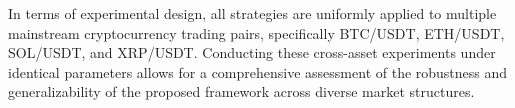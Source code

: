 \documentclass[12pt]{article}
\begin{document}
In terms of experimental design, all strategies are uniformly applied to multiple mainstream 
cryptocurrency trading pairs, specifically BTC/USDT, ETH/USDT, SOL/USDT, and XRP/USDT. 
Conducting these cross-asset experiments under identical parameters allows for a 
comprehensive assessment of the robustness and generalizability of the proposed framework 
across diverse market structures.






\end{document}
